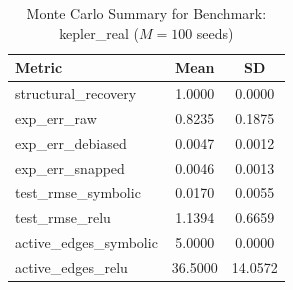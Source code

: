 \begin{table}[ht]
\centering
\caption{Monte Carlo Summary for Benchmark: kepler_real ($M = 100$ seeds)}
\begin{tabular}{lcc}
\hline
Metric & Mean & SD \\
\hline
structural\_recovery & 1.0000 & 0.0000 \\
exp\_err\_raw & 0.8235 & 0.1875 \\
exp\_err\_debiased & 0.0047 & 0.0012 \\
exp\_err\_snapped & 0.0046 & 0.0013 \\
test\_rmse\_symbolic & 0.0170 & 0.0055 \\
test\_rmse\_relu & 1.1394 & 0.6659 \\
active\_edges\_symbolic & 5.0000 & 0.0000 \\
active\_edges\_relu & 36.5000 & 14.0572 \\
\hline
\end{tabular}
\end{table}
